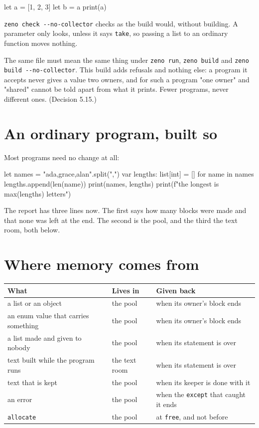 \begin{zeno}[file=moved.zeno, cmd=zeno check --no-collector {file}, fails=yes]
let a = [1, 2, 3]
let b = a
print(a)
\end{zeno}

\verb|zeno check --no-collector| checks as the build would, without
building. A parameter only looks, unless it says \verb|take|, so
passing a list to an ordinary function moves nothing.

\begin{why}
The same file must mean the same thing under \verb|zeno run|,
\verb|zeno build| and \verb|zeno build --no-collector|. This build adds
refusals and nothing else: a program it accepts never gives a value two
owners, and for such a program "one owner" and "shared" cannot be told
apart from what it prints. Fewer programs, never different ones.
(Decision 5.15.)
\end{why}

\section{An ordinary program, built so}

Most programs need no change at all:

\begin{zeno}[file=names.zeno, cmd=zeno build --no-collector --memory {file} ;; ./names]
let names = "ada,grace,alan".split(",")
var lengths: list[int] = []
for name in names {
    lengths.append(len(name))
}
print(names, lengths)
print(f"the longest is {max(lengths)} letters")
\end{zeno}

The report has three lines now. The first says how many blocks were
made and that none was left at the end. The second is the pool, and the
third the text room, both below.

\section{Where memory comes from}

\begin{center}
\begin{tabular}{P{4.6cm}P{2.3cm}P{5cm}}
\toprule
What & Lives in & Given back \\
\midrule
a list or an object & the pool & when its owner's block ends \\
an enum value that carries something & the pool & when its owner's block ends \\
a list made and given to nobody & the pool & when its statement is over \\
text built while the program runs & the text room & when its statement is over \\
text that is kept & the pool & when its keeper is done with it \\
an error & the pool & when the \verb|except| that caught it ends \\
\verb|allocate| & the pool & at \verb|free|, and not before \\
\bottomrule
\end{tabular}
\end{center}


